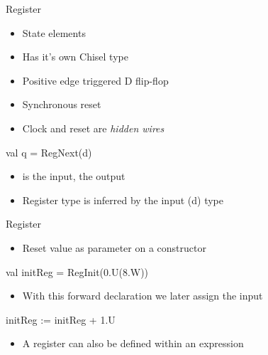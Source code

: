 \begin{frame}[fragile]{Register}
\begin{itemize}
\item State elements
\item Has it's own Chisel type 
\item Positive edge triggered D flip-flop
\item Synchronous reset
\item Clock and reset are \emph{hidden wires}
\end{itemize}
\begin{chisel}
val q = RegNext(d)
\end{chisel}
\begin{itemize}
\item {} is the input,  the output
\item Register type is inferred by the input (d) type
\end{itemize}
\end{frame}

\begin{frame}[fragile]{Register}
\begin{itemize}
\item Reset value as parameter on a  constructor
\end{itemize}
\begin{chisel}
val initReg = RegInit(0.U(8.W))
\end{chisel}
\begin{itemize}
\item With this forward declaration we later assign the input
\end{itemize}
\begin{chisel}
initReg := initReg + 1.U
\end{chisel}
\begin{itemize}
\item A register can also be defined within an expression
\end{itemize}
\end{frame}


